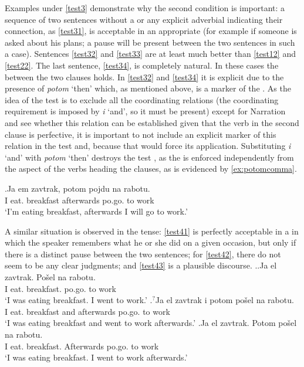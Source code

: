 Examples under \ref{test3} demonstrate why the second condition is important: a sequence of two sentences without a  or any explicit adverbial indicating their connection, as \ref{test31}, is acceptable in an appropriate  (for example if someone is asked about his plans; a pause will be present between the two sentences in such a case). Sentences \ref{test32} and \ref{test33} are at least much better than \ref{test12} and \ref{test22}. The last sentence, \ref{test34}, is completely natural. In these cases the  between the two clauses holds. In \ref{test32} and \ref{test34} it is explicit due to the presence of \textit{potom} `then' which, as mentioned above, is a marker of the . As the idea of the test is to exclude all the coordinating relations (the coordinating requirement is imposed by \textit{i} `and', so it must be present) except for Narration and see whether this relation can be established given that the verb in the second clause is perfective, it is important to not include an explicit marker of this relation in the test  and, because that would force its application. Substituting  \textit{i} `and' with \textit{potom} `then' destroys the test , as the  is enforced independently from the aspect of the verbs heading the clauses, as is evidenced by \ref{ex:potomcomma}.

\exg.\label{ex:potomcomma}Ja em\textsuperscript{\IPF} zavtrak, potom pojdu\textsuperscript{\PF} na rabotu.\\
I eat. breakfast afterwards po.go. to work\\
\trans `I'm eating breakfast, afterwards I will go to work.'

A similar situation is observed in the  tense: \ref{test41} is perfectly acceptable in a  in which the speaker remembers what he or she did on a given occasion, but only if there is a distinct pause between the two sentences; for \ref{test42}, there do not seem to be any clear judgments; and \ref{test43} is a plausible discourse.
\ex.\label{test4}\ag.\label{test41}Ja el\textsuperscript{\IPF} zavtrak. Po\v{s}el\textsuperscript{\PF} na rabotu.\\
I eat. breakfast. po.go. to work\\
\trans `I was eating breakfast. I went to work.'
\bg.\label{test42}$^?$Ja el\textsuperscript{\IPF} zavtrak i potom po\v{s}el\textsuperscript{\PF} na rabotu.\\
I eat. breakfast and afterwards po.go. to work\\
\trans `I was eating breakfast and went to work afterwards.'
\bg.\label{test43}Ja el\textsuperscript{\IPF} zavtrak. Potom po\v{s}el\textsuperscript{\PF} na rabotu.\\
I eat. breakfast. Afterwards po.go. to work\\
\trans `I was eating breakfast. I went to work afterwards.'


